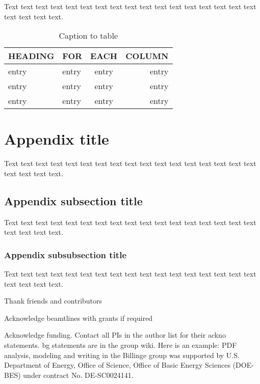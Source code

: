 \documentclass{iucrjournals}
\begin{document}
\begin{enumerate}
Text text text text text text text text text text text text text text
text text text text text text text.


\begin{table}[ht]
\caption{Caption to table \protect\cite{lamport86}} %
\smallskip
\begin{center}
\begin{tabular}{llcr}
\midrule
 HEADING    & FOR        & EACH       & COLUMN     \\
\midrule
 entry      & entry      & entry      & entry      \\
 entry      & entry      & entry      & entry      \\
 entry      & entry      & entry      & entry      \\
\end{tabular}
\end{center}
\end{table}


\appendix %
\section{Appendix title}

Text text text text text text text text text text text text text text
text text text text text text text.

\subsection{Appendix subsection title}

Text text text text text text text text text text text text text text
text text text text text text text.

\subsubsection{Appendix subsubsection title}

Text text text text text text text text text text text text text text
text text text text text text text.

\begin{acknowledgements}
\item Thank friends and contributors
\item Acknowledge beamtlines with grants if required
\item Acknowledge funding. Contact all PIs in the author list for their ackno statements.
  bg statements are in the group wiki.  Here is an example: PDF analysis, modeling and writing
  in the Billinge group was supported by U.S. Department of Energy, Office of Science, Office
  of Basic Energy Sciences (DOE-BES) under contract No. DE-SC0024141.
\end{acknowledgements}


\end{enumerate}
\end{document}
